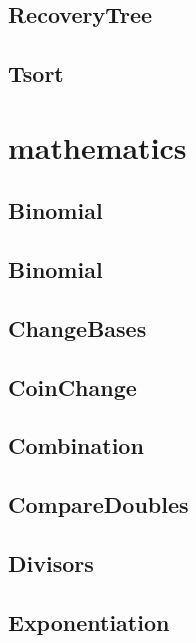 \subsection{ RecoveryTree}
\raggedbottom
\hrulefill
\subsection{ Tsort}
\raggedbottom
\hrulefill

\section{mathematics}
\subsection{ Binomial}
\raggedbottom
\hrulefill
\subsection{ Binomial}
\raggedbottom
\hrulefill
\subsection{ ChangeBases}
\raggedbottom
\hrulefill
\subsection{ CoinChange}
\raggedbottom
\hrulefill
\subsection{ Combination}
\raggedbottom
\hrulefill
\subsection{ CompareDoubles}
\raggedbottom
\hrulefill
\subsection{ Divisors}
\raggedbottom
\hrulefill
\subsection{ Exponentiation}
\raggedbottom
\hrulefill
